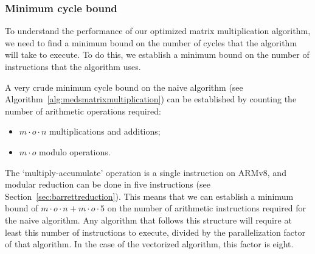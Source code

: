 \documentclass[11pt,a4paper]{report}
\theoremstyle{definition}
\begin{document}
\subsubsection{Minimum cycle bound}
To understand the performance of our optimized matrix multiplication algorithm, we need to find a minimum bound on the number of cycles that the algorithm will take to execute. To do this, we establish a minimum bound on the number of instructions that the algorithm uses.

A very crude minimum cycle bound on the naive algorithm (see Algorithm~\ref{alg:medsmatrixmultiplication}) can be established by counting the number of arithmetic operations required:
\begin{itemize}
  \item $m \cdot o \cdot n$ multiplications and additions;
  \item $m \cdot o$ modulo operations.
\end{itemize}
The `multiply-accumulate' operation is a single instruction on ARMv8, and modular reduction can be done in five instructions (see Section~\ref{sec:barrettreduction}). This means that we can establish a minimum bound of $m \cdot o \cdot n + m \cdot o \cdot 5$ on the number of arithmetic instructions required for the naive algorithm. Any algorithm that follows this structure will require at least this number of instructions to execute, divided by the parallelization factor of that algorithm. In the case of the vectorized algorithm, this factor is eight.

\pagebreak
\end{document}
